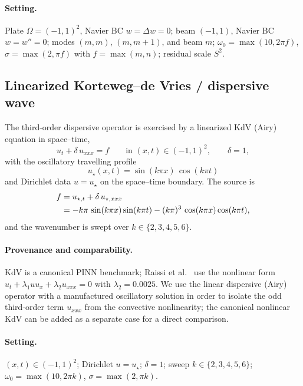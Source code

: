 \paragraph{Setting.}
Plate \(\Omega=(-1,1)^2\), Navier BC \(w=\Delta w=0\); beam \((-1,1)\), Navier
BC \(w=w''=0\); modes \((m,m)\), \((m,m{+}1)\), and beam \(m\);
\(\omega_0=\max(10,2\pi f)\), \(\sigma=\max(2,\pi f)\) with
\(f=\max(m,n)\); residual scale \(S^2\).

\subsection{Linearized Korteweg--de Vries / dispersive wave}\label{sec:bm:kdv}

The third-order dispersive operator is exercised by a linearized KdV (Airy)
equation in space--time,
\begin{equation}\label{eq:kdv_pde}
  u_t + \delta\,u_{xxx} = f
  \qquad \text{in } (x,t) \in (-1,1)^2,
  \qquad \delta = 1,
\end{equation}
with the oscillatory travelling profile
\begin{equation}\label{eq:kdv_sol}
  u_\star(x,t) = \sin(k\pi x)\,\cos(k\pi t)
\end{equation}
and Dirichlet data \(u = u_\star\) on the space--time boundary. The source is
\begin{align}\label{eq:kdv_source}
  f
  &= u_{\star,t} + \delta\,u_{\star,xxx} \notag\\
  &= -k\pi\,\sin(k\pi x)\sin(k\pi t)
     - (k\pi)^3\,\cos(k\pi x)\cos(k\pi t),
\end{align}
and the wavenumber is swept over \(k \in \{2,3,4,5,6\}\).

\paragraph{Provenance and comparability.}
KdV is a canonical PINN benchmark; Raissi et al.~\cite{Raissi2019} use the
nonlinear form \(u_t + \lambda_1 u u_x + \lambda_2 u_{xxx} = 0\) with
\(\lambda_2 = 0.0025\). We use the linear dispersive (Airy) operator with a
manufactured oscillatory solution in order to isolate the odd third-order term
\(u_{xxx}\) from the convective nonlinearity; the canonical nonlinear KdV can be
added as a separate case for a direct comparison.

\paragraph{Setting.}
\((x,t)\in(-1,1)^2\); Dirichlet \(u=u_\star\); \(\delta=1\); sweep
\(k\in\{2,3,4,5,6\}\); \(\omega_0=\max(10,2\pi k)\), \(\sigma=\max(2,\pi k)\).

